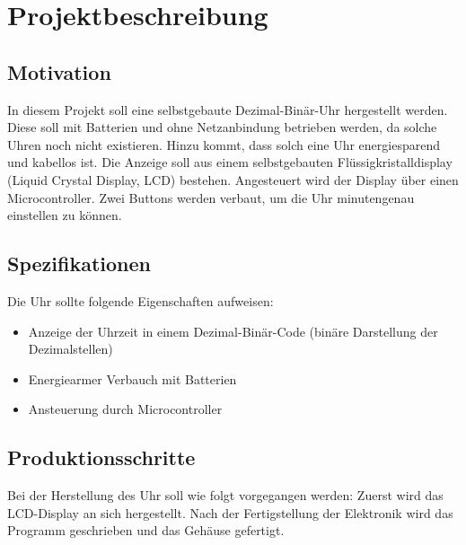 \section{Projektbeschreibung}
\subsection{Motivation}
In diesem Projekt soll eine selbstgebaute Dezimal-Binär-Uhr hergestellt werden. Diese soll mit Batterien und ohne Netzanbindung betrieben werden, da solche Uhren noch nicht existieren. Hinzu kommt, dass solch eine Uhr energiesparend und kabellos ist. Die Anzeige soll aus einem selbstgebauten Flüssigkristalldisplay (Liquid Crystal Display, LCD) bestehen. Angesteuert wird der Display über einen Microcontroller. Zwei Buttons werden verbaut, um die Uhr minutengenau einstellen zu können.

\subsection{Spezifikationen}
Die Uhr sollte folgende Eigenschaften aufweisen:
\begin{itemize}
\item Anzeige der Uhrzeit in einem Dezimal-Binär-Code (binäre Darstellung der Dezimalstellen)
\item Energiearmer Verbauch mit Batterien
\item Ansteuerung durch Microcontroller
\end{itemize}

\subsection{Produktionsschritte}

Bei der Herstellung des Uhr soll wie folgt vorgegangen werden: Zuerst wird das LCD-Display an sich hergestellt. Nach der Fertigstellung der Elektronik wird das Programm geschrieben und das Gehäuse gefertigt. 

